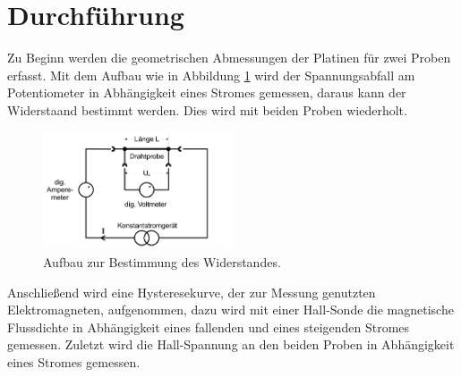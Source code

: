 \newpage
\section{Durchführung}
\label{sec:Durchführung}
Zu Beginn werden die geometrischen Abmessungen der Platinen für zwei Proben erfasst.
Mit dem Aufbau wie in Abbildung \ref{fig:widerstand} wird der Spannungsabfall am Potentiometer in Abhängigkeit eines Stromes gemessen, daraus kann
der Widerstaand bestimmt werden. Dies wird mit beiden Proben wiederholt.
\begin{figure}
  \centering
  \includegraphics[width=0.5\textwidth]{widerstand.PNG}
  \caption{Aufbau zur Bestimmung des Widerstandes.\cite{sample}}
  \label{fig:widerstand}
\end{figure}
\FloatBarrier
Anschließend wird eine Hysteresekurve, der zur Messung genutzten Elektromagneten, aufgenommen, dazu wird mit einer Hall-Sonde die magnetische Flussdichte in Abhängigkeit
eines fallenden und eines steigenden Stromes gemessen.
Zuletzt wird die Hall-Spannung an den beiden Proben in Abhängigkeit eines Stromes gemessen.
